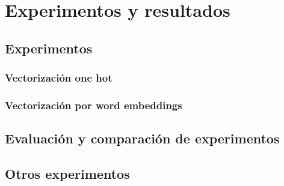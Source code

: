 \chapter{Experimentos y resultados}
\label{ch:results}

\section{Experimentos}

\subsection{Vectorización one hot}

\subsection{Vectorización por word embeddings}

\section{Evaluación y comparación de experimentos}

\section{Otros experimentos}